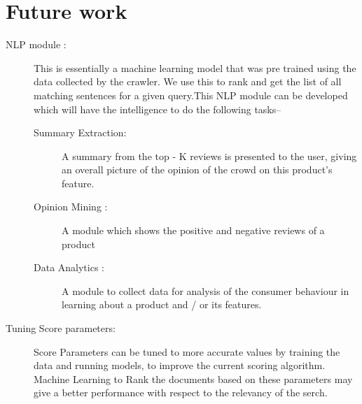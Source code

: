 \documentclass{article}
\begin{document}
\section{Future work}
\begin{description}
  \item[NLP module :] This is essentially a machine learning model that was pre trained using the data collected by the crawler. We use this to rank and get the list of all matching sentences for a given query.This NLP module can be developed which will have the intelligence to do the following tasks--
	\begin{description}
		\item[Summary Extraction: ] A summary from the top - K reviews is presented to the user, giving an overall picture of the opinion of the crowd on this product's feature. 
		\item[Opinion Mining :] A module which shows the positive and negative reviews of a product
		\item[Data Analytics :] A module to collect data for analysis of the consumer behaviour in learning about a product and / or its features.
	\end{description}
 \item[Tuning Score parameters: ] Score Parameters can be tuned to more accurate values by training the data and running models, to improve the current scoring algorithm. Machine Learning to Rank the documents based on these parameters  may give a better performance with respect to the relevancy of the serch.

\end{description}
\end{document}
